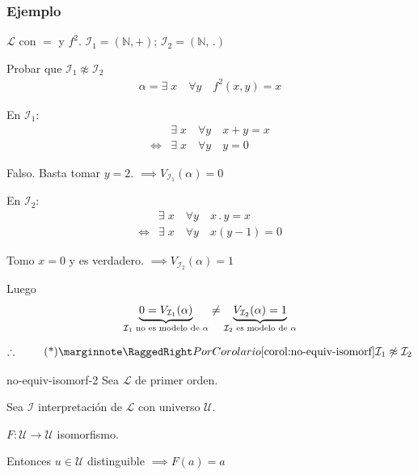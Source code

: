 \subsubsection{Ejemplo}

$\mathcal{L}$ con $=$ y $f^2$. 
$\mathcal{I}_1 = (\mathbb{N}, +)$; $\mathcal{I}_2 = (\mathbb{N}, \, .)$

Probar que $\mathcal{I}_1 \not\approx \mathcal{I}_2$
\begin{gather*}
    \alpha = \exists \; x \quad \forall y \quad f^2 (x,y) = x
\end{gather*}

En $\mathcal{I}_1$:
\begin{align*}
    & \exists \; x \quad \forall y \quad x+y = x \\
    \iff & \exists \; x \quad \forall y \quad y = 0
\end{align*}

Falso. Basta tomar $y = 2$. $\implies V_{\mathcal{I}_1}(\alpha) = 0$

En $\mathcal{I}_2$:
\begin{align*}
    & \exists \; x \quad \forall y \quad x \, . \, y = x \\
    \iff & \exists \; x \quad \forall y \quad x(y-1) = 0
\end{align*}

Tomo $x = 0$ y es verdadero. $\implies V_{\mathcal{I}_2}(\alpha) = 1$

Luego
\begin{gather*}
    \underbrace{0 = V_{\mathcal{I}_1} (\alpha)}_{%
    \mathcal{I}_1 \text{ no es modelo de } \alpha}
    \neq 
    \underbrace{V_{\mathcal{I}_2} (\alpha) = 1}_{%
    \mathcal{I}_2 \text{ es modelo de } \alpha}
\end{gather*}

\begin{gather*}
    \therefore ~ \notamath{Por Corolario \ref{corol:no-equiv-isomorf} }
    \mathcal{I}_1 \not\approx \mathcal{I}_2
\end{gather*}

\medskip

\begin{corolario}{}{no-equiv-isomorf-2}
    Sea $\mathcal{L}$ de primer orden.

    Sea $\mathcal{I}$ interpretación de $\mathcal{L}$ 
    con universo $\mathcal{U}$.

    $F: \mathcal{U} \to \mathcal{U}$ isomorfismo.

    \medskip

    Entonces $u \in \mathcal{U}$ distinguible $\implies F(a) = a$
\end{corolario}

